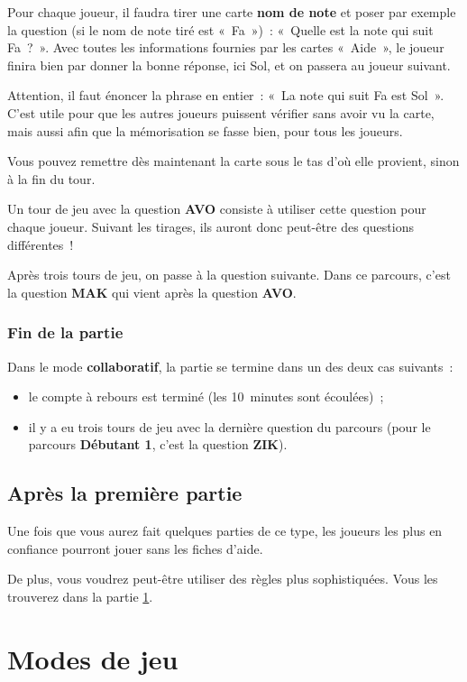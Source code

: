 \documentclass[11pt]{article}
\newcommand{\carte}[1]
{\textbf{#1}}
\newcommand{\parcours}[1]
{\textbf{#1}}
\newcommand{\QST}[1]
{\textbf{#1}}
\newcommand{\mode}[1]
{\textbf{#1}}
\begin{document}
Pour chaque joueur, il faudra tirer une carte \carte{nom de note} et poser par
exemple la question (si le nom de note tiré est « Fa ») : « Quelle est la note
qui suit Fa ? ». Avec toutes les informations fournies par les cartes
« Aide », le joueur finira bien par donner la bonne réponse, ici Sol, et on
passera au joueur suivant.

Attention, il faut énoncer la phrase en entier : « La note qui suit Fa est
Sol ». C’est utile pour que les autres joueurs puissent vérifier sans avoir vu
la carte, mais aussi afin que la mémorisation se fasse bien, pour tous les
joueurs.

Vous pouvez remettre dès maintenant la carte sous le tas d’où elle provient,
sinon à la fin du tour.

Un tour de jeu avec la question \QST{AVO} consiste à utiliser cette question
pour chaque joueur. Suivant les tirages, ils auront donc peut-être des
questions différentes !

Après trois tours de jeu, on passe à la question suivante. Dans ce parcours,
c’est la question \QST{MAK} qui vient après la question \QST{AVO}.

\subsubsection{Fin de la partie}

Dans le mode \mode{collaboratif}, la partie se termine dans un des deux cas
suivants :

\begin{itemize}
    \item le compte à rebours est terminé (les 10 minutes sont écoulées) ;
    \item il y a eu trois tours de jeu avec la dernière question du parcours
        (pour le parcours \parcours{Débutant 1}, c’est la question \QST{ZIK}).
\end{itemize}

\subsection{Après la première partie}

Une fois que vous aurez fait quelques parties de ce type, les joueurs les plus
en confiance pourront jouer sans les fiches d’aide.

De plus, vous voudrez peut-être utiliser des règles plus sophistiquées. Vous
les trouverez dans la partie \ref{modes}.

\section{Modes de jeu} \label{modes}
\end{document}
